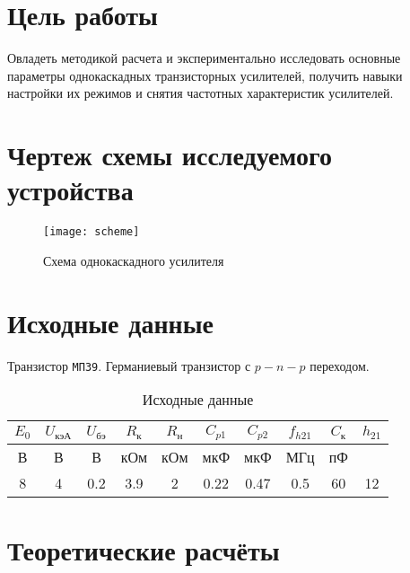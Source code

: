 





\section{Цель работы}

Овладеть методикой расчета и экспериментально исследовать основные параметры однокаскадных транзисторных усилителей, получить навыки настройки их режимов и снятия частотных характеристик усилителей.

\section{Чертеж схемы исследуемого устройства}

\begin{figure}[H]
\begin{center}
	\texttt{[image: scheme]}
	\caption{Схема однокаскадного усилителя}
\end{center}
\end{figure}

\section{Исходные данные}

Транзистор \verb+МП39+. Германиевый транзистор с $p-n-p$ переходом.

\begin{table}[H]
\begin{center}
	\caption{Исходные данные}
	\def\tabcolsep{10pt}
	\begin{tabular}{|c|c|c|c|c|c|c|c|c|c|}
		\hline
		$E_0$ &
		$U_\text{кэА}$ &
		$U_\text{бэ}$ &
		$R_\text{к}$ &
		$R_\text{н}$ &
		$C_{p1}$ &
		$C_{p2}$ &
		$f_{h21}$ &
		$C_\text{к}$ &
		$h_{21}$ \\
		\hline
		В &
		В &
		В &
		кОм &
		кОм &
		мкФ &
		мкФ &
		МГц &
		пФ &
		\\
		\hline
		8 &
		4 &
		0.2 &
		3.9 &
		2 &
		0.22 &
		0.47 &
		0.5 &
		60 &
		12 \\
	    \hline	
	\end{tabular}
	\label{tabular:1}
\end{center}
\end{table}

\newpage

\section{Теоретические расчёты}

